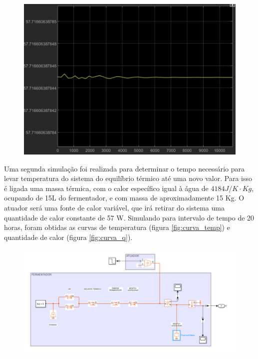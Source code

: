 \begin{figure}[h]
    \centering
    \includegraphics[scale=0.30]{figuras/projeto/controle/curva_calor.jpg}
    \label{fig:curva_calor}
\end{figure}


Uma segunda simulação foi realizada para determinar o tempo necessário para levar temperatura do sistema do  equilíbrio térmico até uma novo valor. Para isso é ligada uma massa térmica, com o calor específico igual à água de \( 4184 J/K \cdot Kg \), ocupando de 15L do fermentador, e com massa de aproximadamente 15 Kg. O atuador será uma fonte de calor variável, que irá retirar do sistema uma quantidade de calor constante de 57 W. Simulando para intervalo de tempo de 20 horas, foram obtidas as curvas de temperatura (figura \ref{fig:curva_temp}) e quantidade de calor (figura \ref{fig:curva_q}).


\begin{figure}[H]
    \centering
    \includegraphics[scale=0.50]{figuras/projeto/controle/circ_atuador.png}
    \label{fig:circ_atuador}
\end{figure}



